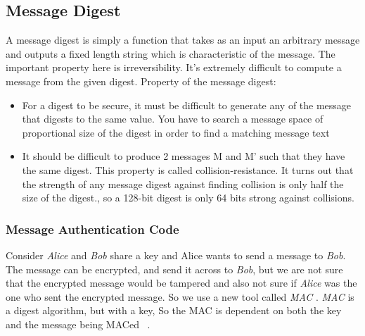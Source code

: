 \documentclass[a4paper]{article}
\begin{document}
\subsection{Message Digest}
A message digest is simply a function that takes as an input an arbitrary message and outputs a fixed length string 
which is characteristic of the message. The important property here is irreversibility.  
It's extremely difficult to compute a message from the given digest. 
Property of the message digest: 
\begin{itemize}
    \item For a digest to be secure, it must be difficult to generate any of the message that digests to the same value. 
        You have to search a message space of proportional size of the digest in order to find a matching message text
    \item It should be difficult to produce 2 messages M and M' such that they have the same digest. 
        This property is called collision-resistance. It turns out that the strength of any message digest 
        against finding collision is only half the size of the digest., so a 128-bit digest is only 64 bits strong against collisions.
\end{itemize}
\subsubsection{Message Authentication Code}
Consider \textit{Alice} and \textit{Bob} share a key and Alice wants to send a message to \textit{Bob}. The message can be encrypted, 
and send it across to \textit{Bob}, but we are not sure that the encrypted message would be tampered and also not sure 
if \textit{Alice} was the one who sent the encrypted message.  So we use a new tool called \textit{MAC} . \textit{MAC} is a digest algorithm,
but with a key, So the MAC is dependent on both the key and the message being MACed ~\cite{eric}.
\end{document}
